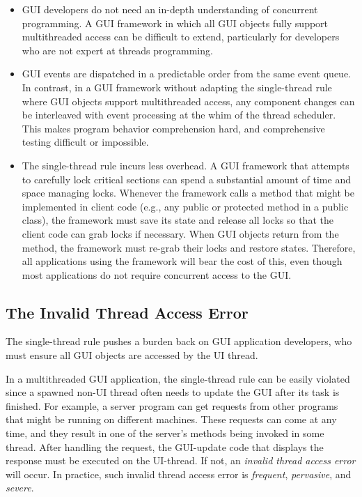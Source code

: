 \begin{itemize}

\item GUI developers do not need an in-depth
understanding of concurrent programming. A GUI framework in which all GUI objects
fully support multithreaded access can be difficult to extend, particularly
for developers who are not expert at threads programming.

\item GUI events are dispatched in a predictable order from the same event queue.
In contrast, in a GUI framework without adapting the single-thread rule where GUI objects 
support multithreaded access, any component changes can be interleaved with event
processing at the whim of the thread scheduler. This makes program behavior comprehension hard,
 and comprehensive testing difficult or impossible. 

\item The single-thread rule incurs less overhead.
A GUI framework that attempts to carefully lock critical sections can spend a substantial
amount of time and space managing locks. Whenever the framework calls a method that might
be implemented in client code (e.g., any public or protected method in a public class),
the framework must save its state and release all locks so that the client code can grab locks
if necessary. When GUI objects return from the method, the framework must re-grab their locks and
restore states. Therefore, all applications using the framework will bear the cost of this, even though most
applications do not require concurrent access to the GUI.

\end{itemize}


\subsection{The Invalid Thread Access Error}

The single-thread rule pushes a burden back on GUI application developers,
who must ensure all GUI objects are accessed by the UI thread.

In a multithreaded GUI application, the single-thread rule can be
easily violated since a spawned non-UI thread often needs to update
the GUI  after its  task is finished.
For example, a server program can get requests from other programs
that might be running on different machines. These requests can come at any time,
and they result in one of the server's methods being invoked in some thread.
After handling the request, the GUI-update code that displays the response must be executed on the UI-thread.
If not, an \textit{invalid thread access error} will occur. In practice, such
invalid thread access error is \textit{frequent}, \textit{pervasive}, and \textit{severe}.

